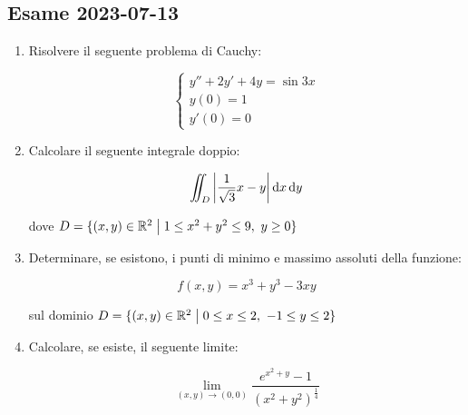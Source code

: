 \subsection{Esame 2023{-}07{-}13}

\begin{enumerate}
    \itemsep32pt
    \item Risolvere il seguente problema di Cauchy:

          \begin{equation*}
              \begin{cases}
                  y'' + 2y' + 4y = \sin 3x \\
                  y(0) = 1                 \\
                  y'(0) = 0
              \end{cases}
          \end{equation*}

    \item Calcolare il seguente integrale doppio:

          \[
              \iint_{D} \left|\frac{1}{\sqrt{3}}x-y\right| \mathop{}\!\mathrm{d}{x}\mathop{}\!\mathrm{d}{y}
          \]

          dove \(D = \{(x,y) \in \mathbb{R}^{2} \;\big|\; 1 \le x^2 + y^2 \le 9,\ y \ge 0\} \)

    \item Determinare, se esistono, i punti di minimo e massimo assoluti della funzione:

          \[
              f(x,y) = x^3 + y^3 - 3xy
          \]

          sul dominio \(D = \{ (x,y) \in \mathbb{R}^2 \;\big|\; 0 \le x \le 2,\ -1 \le y \le 2 \}\)

    \item Calcolare, se esiste, il seguente limite:

          \[
              \lim_{(x,y) \rightarrow (0,0)}
              \frac
              {e^{x^{2}+y}-1}
              {{(x^2+y^2)}^{\frac{1}{4}}}
          \]

\end{enumerate}
